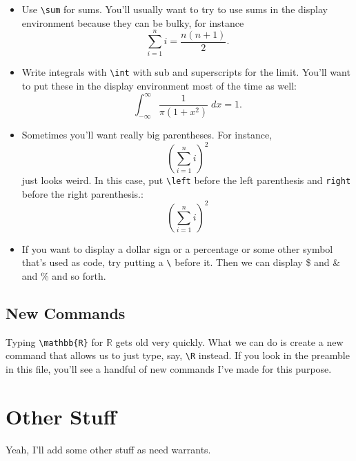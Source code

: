 \documentclass[12pt]{article}
\newcommand{\R}{\mathbb{R}}
\begin{document}
\begin{itemize}
		\item Use \verb|\sum| for sums. You'll usually want to try to use sums in the display environment because they can be bulky, for instance
			\[\sum_{i=1}^n i = \frac{n(n+1)}{2}.\]
		\item Write integrals with \verb|\int| with sub and superscripts for the limit. You'll want to put these in the display environment most of the time as well:
			\[ \int_{-\infty}^{\infty} \frac{1}{\pi(1+x^2)} \; dx = 1 .\]
		\item Sometimes you'll want really big parentheses. For instance,
				\[ ( \sum_{i=1}^n i)^2	\]
			just looks weird. In this case, put \verb|\left| before the left parenthesis and \verb|right| before the right parenthesis.:
				\[ \left( \sum_{i=1}^n i \right)^2	\]
		\item If you want to display a dollar sign or a percentage or some other symbol that's used as code, try putting a \verb|\| before it. Then we can display \$ and \& and \% and so forth.
	\end{itemize}

	
	\subsection{New Commands}
	
	Typing \verb|\mathbb{R}| for $\mathbb{R}$ gets old very quickly. What we can do is create a new command that allows us to just type, say, \verb|\R| instead. If you look in the preamble in this file, you'll see a handful of new commands I've made for this purpose. 
	
	
	
	\section{Other Stuff}
	
	Yeah, I'll add some other stuff as need warrants. 
 
	
\end{document}
